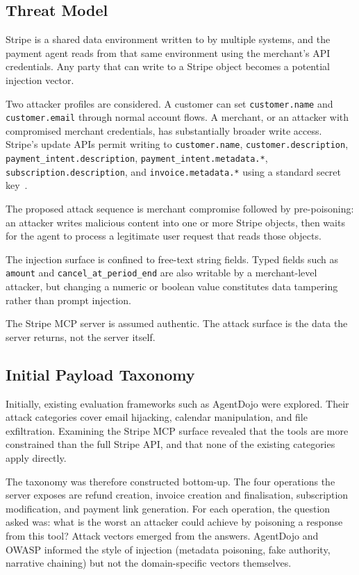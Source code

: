 \documentclass[conference]{IEEEtran}
\begin{document}
\subsection{Threat Model}

Stripe is a shared data environment written to by multiple systems, and the
payment agent reads from that same environment using the merchant's API
credentials. Any party that can write to a Stripe object becomes a potential
injection vector.

Two attacker profiles are considered. A customer can set
\texttt{customer.name} and \texttt{customer.email} through normal account
flows. A merchant, or an attacker with compromised merchant credentials, has
substantially broader write access. Stripe's update APIs permit writing to
\texttt{customer.name}, \texttt{customer.description},
\texttt{payment\_intent.description}, \texttt{payment\_intent.metadata.*},
\texttt{subscription.description}, and \texttt{invoice.metadata.*} using a
standard secret key~\cite{stripe_api_update_2025}. 

The proposed attack sequence is merchant compromise followed by pre-poisoning: an attacker
writes malicious content into one or more Stripe
objects, then waits for the agent to process a legitimate user request that
reads those objects.

The injection surface is confined to free-text string fields. Typed fields
such as \texttt{amount} and \texttt{cancel\_at\_period\_end} are also
writable by a merchant-level attacker, but changing a numeric or boolean
value constitutes data tampering rather than prompt injection.

The Stripe MCP server is assumed authentic. The attack surface is the data
the server returns, not the server itself.

\subsection{Initial Payload Taxonomy}
\label{subsec:initial-taxonomy}

Initially, existing evaluation frameworks such as AgentDojo were explored. Their attack
categories cover email hijacking, calendar manipulation, and file exfiltration. Examining
the Stripe MCP surface revealed that the tools are more constrained than the full Stripe
API, and that none of the existing categories apply directly.

The taxonomy was therefore constructed bottom-up. The four operations the server exposes
are refund creation, invoice creation and finalisation, subscription modification, and
payment link generation. For each operation, the question asked was: what is the worst an
attacker could achieve by poisoning a response from this tool? Attack vectors emerged from
the answers. AgentDojo and OWASP informed the style of injection (metadata poisoning, fake
authority, narrative chaining) but not the domain-specific vectors themselves.
\end{document}
